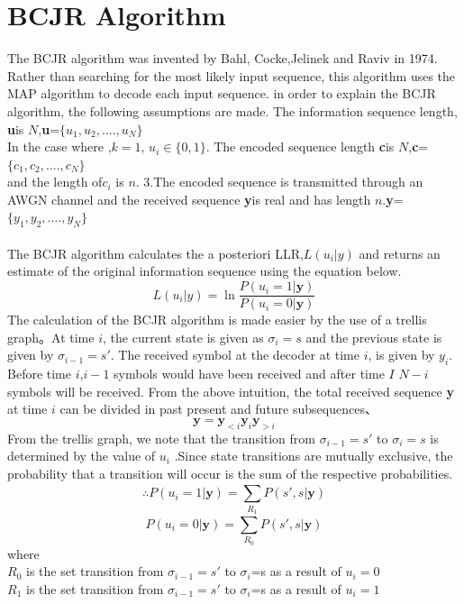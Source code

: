 \documentclass[20 pts]{article}
\begin{document}
\section{BCJR Algorithm}
The BCJR algorithm was invented by Bahl, Cocke,Jelinek and Raviv in 1974. Rather than searching for the most likely input sequence, this algorithm uses the MAP algorithm to decode each input sequence. in order to explain the BCJR algorithm, the following assumptions are made. The information sequence length, \textbf{u}is $N$,\textbf{u}=$\{u_1,u_2,....,u_N\}$\\
In the case where ,$k=1$, $u_i\in \{0,1\}$. The encoded sequence length \textbf{c}is $N$,\textbf{c}=$\{c_1,c_2,....,c_N\}$\\
and the length of$c_i$ is $n$.\newline
3.The encoded sequence is transmitted through an AWGN channel and the received sequence \textbf{y}is real and has length $n$.\textbf{y}=$\{y_1,y_2,....,y_N\}$\paragraph{}
The BCJR algorithm calculates the a posteriori LLR,$L(u_i|y)$ and returns an estimate of the original information sequence using the equation below.\begin{equation}L(u_i|y)=\ln\frac{P(u_i=1|\boldsymbol{y})}{P(u_i=0|\boldsymbol{y})}\end{equation}
The calculation of the BCJR algorithm is made easier by the use of a trellis graph。At time $i$, the current state is given as $\sigma_i=s$ and the previous state is given by $\sigma_{i-1}=s'$. The received symbol at the decoder at time $i$, is given by $y_i$. Before time $i$,$i-1$ symbols would have been received and after time $I$ $N-i$ symbols will be received. From the above intuition, the total received sequence \textbf{y} at time $i$ can be divided in past present and future subsequences、$$\boldsymbol{y}=\boldsymbol{y}_{<i} \boldsymbol{y}_{i} \boldsymbol{y}_{>i}$$
From the trellis graph, we note that the transition from $\sigma_{i-1}=s'$ to $\sigma_i=s$ is determined by the value of $u_i$ .Since state transitions are mutually exclusive, the probability that a transition will occur is the sum of the respective probabilities.
$$\therefore P(u_i=1|\boldsymbol{y})=\sum_{R_1}^{}P(s',s|\boldsymbol{y})$$
$$P(u_i=0|\boldsymbol{y})=\sum_{R_0}^{}P(s',s|\boldsymbol{y})$$
where\\ $R_0$ is the set  transition from $\sigma_{i-1}=s'$ to $\sigma_i$=s as a result of $u_i=0$\\
$R_1$ is the set  transition from $\sigma_{i-1}=s'$ to $\sigma_i$=s as a result of $u_i=1$\\
\end{document}
